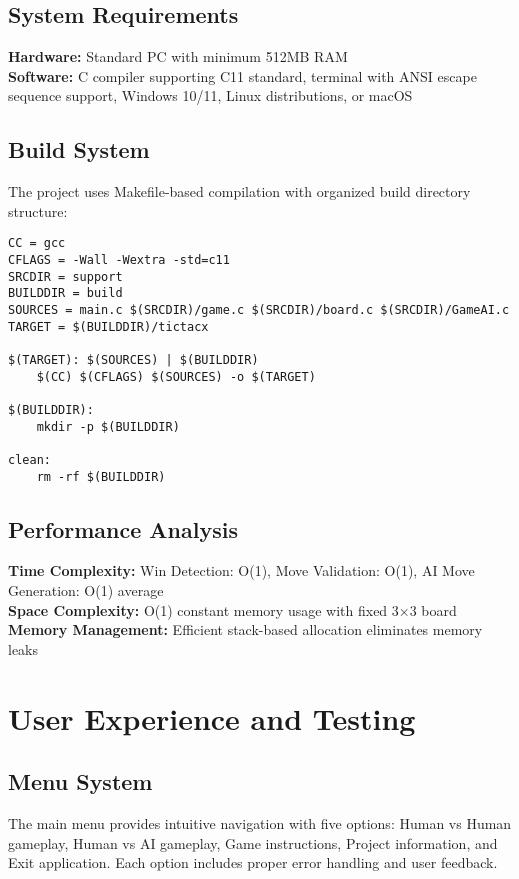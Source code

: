 \documentclass[12pt]{article}
\begin{document}
\subsection{System Requirements}
\textbf{Hardware:} Standard PC with minimum 512MB RAM\\
\textbf{Software:} C compiler supporting C11 standard, terminal with ANSI escape sequence support, Windows 10/11, Linux distributions, or macOS

\subsection{Build System}
The project uses Makefile-based compilation with organized build directory structure:

\begin{lstlisting}[caption=Makefile Build System]
CC = gcc
CFLAGS = -Wall -Wextra -std=c11
SRCDIR = support
BUILDDIR = build
SOURCES = main.c $(SRCDIR)/game.c $(SRCDIR)/board.c $(SRCDIR)/GameAI.c
TARGET = $(BUILDDIR)/tictacx

$(TARGET): $(SOURCES) | $(BUILDDIR)
	$(CC) $(CFLAGS) $(SOURCES) -o $(TARGET)

$(BUILDDIR):
	mkdir -p $(BUILDDIR)

clean:
	rm -rf $(BUILDDIR)
\end{lstlisting}

\subsection{Performance Analysis}
\textbf{Time Complexity:} Win Detection: O(1), Move Validation: O(1), AI Move Generation: O(1) average\\
\textbf{Space Complexity:} O(1) constant memory usage with fixed 3×3 board\\
\textbf{Memory Management:} Efficient stack-based allocation eliminates memory leaks

\section{User Experience and Testing}

\subsection{Menu System}
The main menu provides intuitive navigation with five options: Human vs Human gameplay, Human vs AI gameplay, Game instructions, Project information, and Exit application. Each option includes proper error handling and user feedback.
\end{document}

